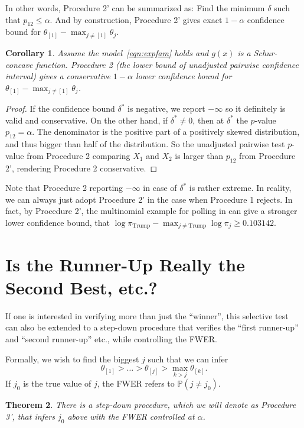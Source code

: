 \documentclass[11pt]{article}
\newtheorem{corollary}{Corollary}
\newtheorem{theorem}[corollary]{Theorem}
\newcommand{\PP}{\mathbb{P}}
\begin{document}
In other words, Procedure 2' can be summarized as: Find the minimum $\delta$ such that $p_{12} \le \alpha$. And by construction, Procedure 2' gives exact $1-\alpha$ confidence bound for $\theta_{[1]} - \max_{j \ne [1]} \theta_j$.

\begin{corollary}
Assume the model~\eqref{eqn:expfam} holds and $g\left(x\right)$ is a Schur-concave function. Procedure 2 (the lower bound of unadjusted pairwise confidence interval) gives a conservative $1-\alpha$ lower confidence bound for $\theta_{[1]} - \max_{j \ne [1]} \theta_j$.
\end{corollary}

\begin{proof}
If the confidence bound $\delta^*$ is negative, we report $-\infty$ so it definitely is valid and conservative. On the other hand, if $\delta^* \ne 0$, then at $\delta^*$ the $p$-value $p_{12} = \alpha$. The denominator is the positive part of a positively skewed distribution, and thus bigger than half of the distribution. So the unadjusted pairwise test $p$-value from Procedure 2 comparing $X_1$ and $X_2$ is larger than $p_{12}$ from Procedure 2', rendering Procedure 2 conservative.
\end{proof}

Note that Procedure 2 reporting $-\infty$ in case of $\delta^*$ is rather extreme. In reality, we can always just adopt Procedure 2' in the case when Procedure 1 rejects. In fact, by Procedure 2', the multinomial example for polling in  can give a stronger lower confidence bound, that $\log \pi_{\text{Trump}} - \max_{j \ne \text{Trump}} \log \pi_{j} \ge 0.103142$.

\section{Is the Runner-Up Really the Second Best, etc.?}
\label{sec:stepdown}

If one is interested in verifying more than just the ``winner'', this selective test can also be extended to a step-down procedure that verifies the ``first runner-up'' and ``second runner-up'' etc., while controlling the FWER.

Formally, we wish to find the biggest $j$ such that we can infer
$$\theta_{[1]} > \ldots > \theta_{[j]} > \max_{k>j} \theta_{[k]}.$$
If $j_0$ is the true value of $j$, the FWER refers to $\PP\left(j \ne j_0\right)$.

\begin{theorem}
There is a step-down procedure, which we will denote as Procedure 3', that infers $j_0$ above with the FWER controlled at $\alpha$.
\end{theorem}
\end{document}
